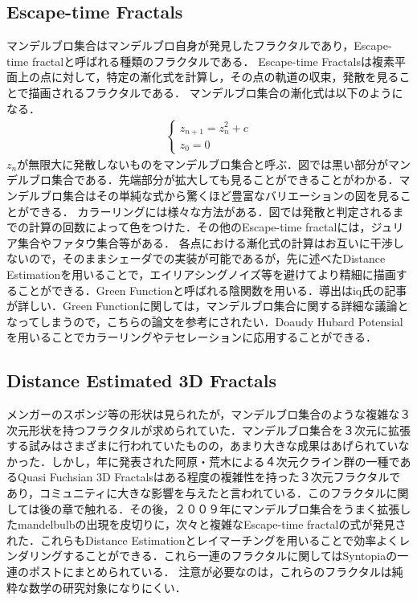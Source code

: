 \subsection{Escape-time Fractals}
マンデルブロ集合はマンデルブロ自身が発見したフラクタルであり，Escape-time fractalと呼ばれる種類のフラクタルである．
Escape-time Fractalsは複素平面上の点に対して，特定の漸化式を計算し，その点の軌道の収束，発散を見ることで描画されるフラクタルである．
マンデルブロ集合の漸化式は以下のようになる．
\begin{eqnarray*}
 \begin{cases}
  z_{n+1} = z^2_{n} + c \\ z_0 = 0
 \end{cases}
\end{eqnarray*}
$z_n$が無限大に発散しないものをマンデルブロ集合と呼ぶ．図では黒い部分がマンデルブロ集合である．先端部分が拡大しても見ることができることがわかる．マンデルブロ集合はその単純な式から驚くほど豊富なバリエーションの図を見ることができる．
カラーリングには様々な方法がある．図では発散と判定されるまでの計算の回数によって色をつけた．その他のEscape-time fractalには，ジュリア集合やファタウ集合等がある．
各点における漸化式の計算はお互いに干渉しないので，そのままシェーダでの実装が可能であるが，先に述べたDistance Estimationを用いることで，エイリアシングノイズ等を避けてより精細に描画することができる．Green Functionと呼ばれる陰関数を用いる．導出はiq氏の記事が詳しい．Green Functionに関しては，マンデルブロ集合に関する詳細な議論となってしまうので，こちらの論文を参考にされたい．Doaudy Hubard Potensialを用いることでカラーリングやテセレーションに応用することができる．

\subsection{Distance Estimated 3D Fractals}
メンガーのスポンジ等の形状は見られたが，マンデルブロ集合のような複雑な３次元形状を持つフラクタルが求められていた．マンデルブロ集合を３次元に拡張する試みはさまざまに行われていたものの，あまり大きな成果はあげられていなかった．しかし，年に発表された阿原・荒木による４次元クライン群の一種であるQuasi Fuchsian 3D Fractalsはある程度の複雑性を持った３次元フラクタルであり，コミュニティに大きな影響を与えたと言われている．このフラクタルに関しては後の章で触れる．その後，２００９年にマンデルブロ集合をうまく拡張したmandelbulbの出現を皮切りに，次々と複雑なEscape-time fractalの式が発見された．これらもDistance Estimationとレイマーチングを用いることで効率よくレンダリングすることができる．これら一連のフラクタルに関してはSyntopiaの一連のポストにまとめられている．
注意が必要なのは，これらのフラクタルは純粋な数学の研究対象になりにくい．

